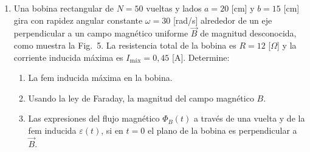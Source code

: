 \documentclass[11pt,letterpaper]{article}
\begin{document}
\begin{enumerate}
\begin{center}
\\[2pt]
Figura 4
\end{center}

\pagebreak
\item Una bobina rectangular de $N = 50$ vueltas y lados $a = 20$ [cm] y $b = 15$ [cm] gira con
rapidez angular constante $\omega = 30$ [rad/s] alrededor de un eje perpendicular a un campo
magn\'etico uniforme $\vec{B}$ de magnitud desconocida, como muestra la Fig.\ 5. La resistencia
total de la bobina es $R = 12$ [$\Omega$] y la corriente inducida m\'axima es
$I_{\text{m\'ax}} = 0{,}45$ [A]. Determine:

\begin{enumerate}
\item La fem inducida m\'axima en la bobina.

\item Usando la ley de Faraday, la magnitud del campo magn\'etico $B$.

\item Las expresiones del flujo magn\'etico $\Phi_B(t)$ a trav\'es de una vuelta y de la fem
inducida $\varepsilon(t)$, si en $t = 0$ el plano de la bobina es perpendicular a $\vec{B}$.
\end{enumerate}


\end{enumerate}
\end{document}

